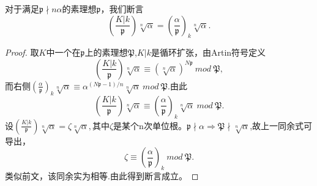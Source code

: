 \documentclass[UTF8]{article}
\begin{document}
对于满足$\mathfrak{p}\nmid n\alpha$的素理想$\mathfrak{p}$，我们断言
$$
\left(\frac{K|k}{\mathfrak{p}}\right)\sqrt[n]{\alpha}=\left(\frac{\alpha}{\mathfrak{p}}\right)_{k}\sqrt[n]{\alpha}.
$$
\begin{proof}

取$K$中一个在$\mathfrak{p}$上的素理想$\mathfrak{P}$,$K|k$是循环扩张，由Artin符号定义
$$
\left(\frac{K|k}{\mathfrak{p}}\right)\sqrt[n]{\alpha}\equiv (\sqrt[n]{\alpha})^{N\mathfrak{p}}\ mod \ \mathfrak{P},
$$
而右侧$\left(\frac{\alpha}{\mathfrak{p}}\right)_{k}\sqrt[n]{\alpha}\equiv \alpha^{(N\mathfrak{p}-1)/n}\sqrt[n]{\alpha} \ mod \ \mathfrak{P}$.由此
$$
\left(\frac{K|k}{\mathfrak{p}}\right)\sqrt[n]{\alpha}\equiv\left(\frac{\alpha}{\mathfrak{p}}\right)_{k}\sqrt[n]{\alpha}\ mod \ \mathfrak{P}.
$$
设$\left(\frac{K|k}{\mathfrak{p}}\right)\sqrt[n]{\alpha}=\zeta \sqrt[n]{\alpha},$其中$\zeta$是某个n次单位根。$\mathfrak{p}\nmid \alpha\Rightarrow\mathfrak{P}\nmid \sqrt[n]{\alpha}$,故上一同余式可导出，
$$
\zeta\equiv \left(\frac{\alpha}{\mathfrak{p}}\right)_{k}\ mod \ \mathfrak{P}.
$$
类似前文，该同余实为相等.由此得到断言成立。
\end{proof}
\end{document}
